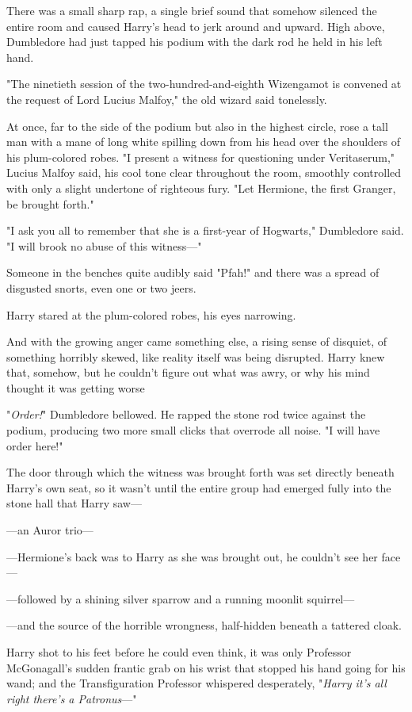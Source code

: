 There was a small sharp rap, a single brief sound that somehow silenced the
entire room and caused Harry's head to jerk around and upward. High above,
Dumbledore had just tapped his podium with the dark rod he held in his left
hand.

"The ninetieth session of the two-hundred-and-eighth Wizengamot is convened at
the request of Lord Lucius Malfoy," the old wizard said tonelessly.

At once, far to the side of the podium but also in the highest circle, rose a
tall man with a mane of long white spilling down from his head over the
shoulders of his plum-colored robes. "I present a witness for questioning under
Veritaserum," Lucius Malfoy said, his cool tone clear throughout the room,
smoothly controlled with only a slight undertone of righteous fury. "Let
Hermione, the first Granger, be brought forth."

"I ask you all to remember that she is a first-year of Hogwarts," Dumbledore
said. "I will brook no abuse of this witness—"

Someone in the benches quite audibly said "Pfah!" and there was a spread of
disgusted snorts, even one or two jeers.

Harry stared at the plum-colored robes, his eyes narrowing.

And with the growing anger came something else, a rising sense of disquiet, of
something horribly skewed, like reality itself was being disrupted. Harry knew
that, somehow, but he couldn't figure out what was awry, or why his mind
thought it was getting worse{\el}

"\emph{Order!}" Dumbledore bellowed. He rapped the stone rod twice against the
podium, producing two more small clicks that overrode all noise. "I will have
order here!"

The door through which the witness was brought forth was set directly beneath
Harry's own seat, so it wasn't until the entire group had emerged fully into
the stone hall that Harry saw—

—an Auror trio—

—Hermione's back was to Harry as she was brought out, he couldn't see her
face—

—followed by a shining silver sparrow and a running moonlit squirrel—

—and the source of the horrible wrongness, half-hidden beneath a tattered
cloak.

Harry shot to his feet before he could even think, it was only Professor
McGonagall's sudden frantic grab on his wrist that stopped his hand going for
his wand; and the Transfiguration Professor whispered desperately, "\emph{Harry
it's all right there's a Patronus}—"

